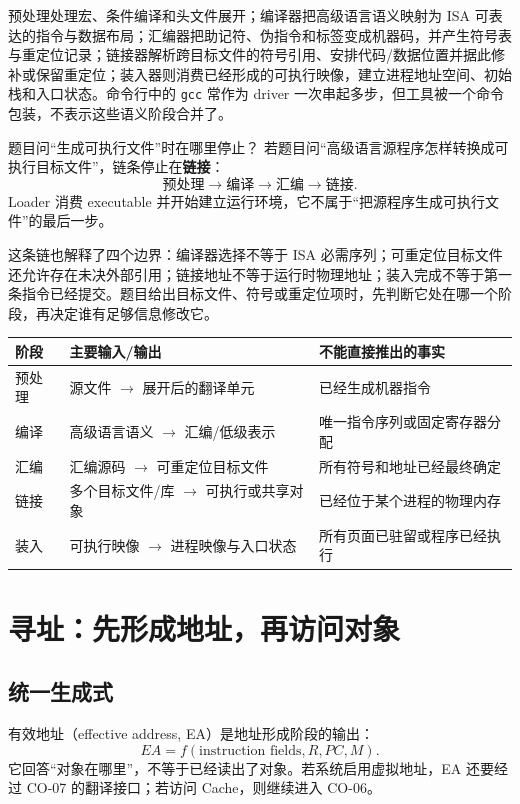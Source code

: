 \documentclass[UTF8,fontset=fandol,11pt,a4paper]{ctexart}
\newcommand{\kw}[1]{\textbf{\color{deep}#1}}
\newcommand{\code}[1]{\texttt{#1}}
\begin{document}
预处理处理宏、条件编译和头文件展开；编译器把高级语言语义映射为 ISA 可表达的指令与数据布局；汇编器把助记符、伪指令和标签变成机器码，并产生符号表与重定位记录；链接器解析跨目标文件的符号引用、安排代码/数据位置并据此修补或保留重定位；装入器则消费已经形成的可执行映像，建立进程地址空间、初始栈和入口状态。命令行中的 \code{gcc} 常作为 driver 一次串起多步，但工具被一个命令包装，不表示这些语义阶段合并了。

\begin{methodbox}{题目问“生成可执行文件”时在哪里停止？}
若题目问“高级语言源程序怎样转换成可执行目标文件”，链条停止在\kw{链接}：
\[
\boxed{\text{预处理}\to\text{编译}\to\text{汇编}\to\text{链接}}.
\]
Loader 消费 executable 并开始建立运行环境，它不属于“把源程序生成可执行文件”的最后一步。
\end{methodbox}

这条链也解释了四个边界：编译器选择不等于 ISA 必需序列；可重定位目标文件还允许存在未决外部引用；链接地址不等于运行时物理地址；装入完成不等于第一条指令已经提交。题目给出目标文件、符号或重定位项时，先判断它处在哪一个阶段，再决定谁有足够信息修改它。

\begin{center}\small
\begin{tabularx}{\linewidth}{L{2.0cm}YY}
\toprule
阶段 & 主要输入/输出 & 不能直接推出的事实\\\midrule
预处理 & 源文件 $\to$ 展开后的翻译单元 & 已经生成机器指令\\
编译 & 高级语言语义 $\to$ 汇编/低级表示 & 唯一指令序列或固定寄存器分配\\
汇编 & 汇编源码 $\to$ 可重定位目标文件 & 所有符号和地址已经最终确定\\
链接 & 多个目标文件/库 $\to$ 可执行或共享对象 & 已经位于某个进程的物理内存\\
装入 & 可执行映像 $\to$ 进程映像与入口状态 & 所有页面已驻留或程序已经执行\\
\bottomrule
\end{tabularx}\end{center}

\section{寻址：先形成地址，再访问对象}

\subsection{统一生成式}
有效地址（effective address, EA）是地址形成阶段的输出：
\[
EA=f(\text{instruction fields},R,PC,M).
\]
它回答“对象在哪里”，不等于已经读出了对象。若系统启用虚拟地址，EA 还要经过 CO-07 的翻译接口；若访问 Cache，则继续进入 CO-06。
\end{document}
